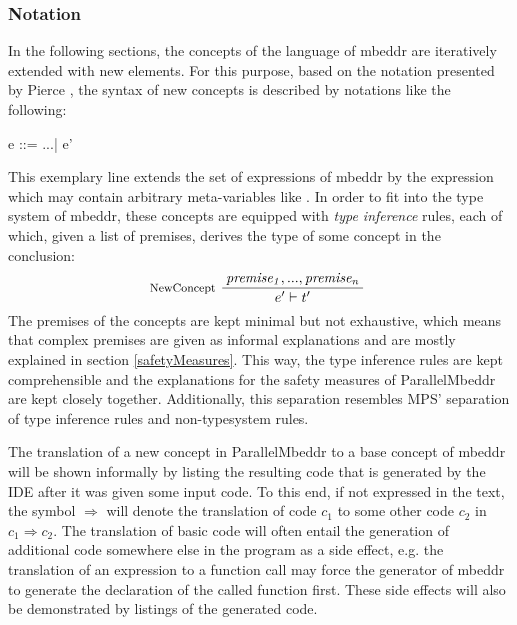 \subsubsection{Notation}
In the following sections, the concepts of the language of mbeddr are iteratively extended with new elements. For this purpose, based on the notation presented by Pierce \cite{TypesAndProgrammingLanguages}, the syntax of new concepts is described by notations like the following:
\begin{ccode}
e ::= ...| e'
\end{ccode}
This exemplary line extends the set of expressions of mbeddr by the expression  which may contain arbitrary meta-variables like . In order to fit into the type system of mbeddr, these concepts are equipped with \textit{type inference} rules, each of which, given a list of premises, derives the type of some concept in the conclusion:
\begin{align*}
\inference*[NewConcept]{\mathit{premise_1}, ..., \mathit{premise_n}}{\qquad\quad e' |- t' \qquad\quad} 
\end{align*}
The premises of the concepts are kept minimal but not exhaustive, which means that complex premises are given as informal explanations and are mostly explained in section \ref{safetyMeasures}. This way, the type inference rules are kept comprehensible and the explanations for the safety measures of ParallelMbeddr are kept closely together. Additionally, this separation resembles MPS' separation of type inference rules and non-typesystem rules.

The translation of a new concept in ParallelMbeddr to a base concept of mbeddr will be shown informally by listing the resulting code that is generated by the IDE after it was given some input code. To this end, if not expressed in the text, the symbol $\Longrightarrow$ will denote the translation of code $c_1$ to some other code $c_2$ in $c_1 \Longrightarrow c_2$. The translation of basic code will often entail the generation of additional code somewhere else in the program as a side effect, e.g. the translation of an expression to a function call may force the generator of mbeddr to generate the declaration of the called function first. These side effects will also be demonstrated by listings of the generated code.